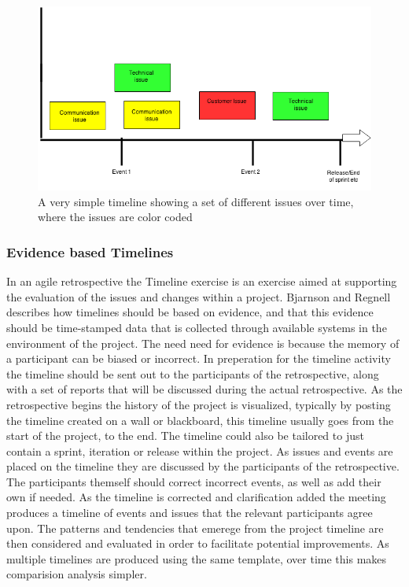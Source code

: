 \documentclass[12pt]{article}
\begin{document}
\begin{figure}[h!]
	\centering
	\includegraphics[width=\textwidth]{figures/Timeline-Example.png}
	\caption{A very simple timeline showing a set of different issues over time, where the issues are color coded}
	\label{figure:Timeline-Example}
\end{figure}

\subsubsection{Evidence based Timelines}
In an agile retrospective the Timeline exercise is an exercise aimed at supporting the evaluation of the issues and changes within a project. Bjarnson and Regnell~\cite{Bjarnason2012} describes how timelines should be based on evidence, and that this evidence should be time-stamped data that is collected through available systems in the environment of the project. The need need for evidence is because the memory of a participant can be biased or incorrect. In preperation for the timeline activity the timeline should be sent out to the participants of the retrospective, along with a set of reports that will be discussed during the actual retrospective. As the retrospective begins the history of the project is visualized, typically by posting the timeline created on a wall or blackboard, this timeline usually goes from the start of the project, to the end. The timeline could also be tailored to just contain a sprint, iteration or release within the project. As issues and events are placed on the timeline they are discussed by the participants of the retrospective. The participants themself should correct incorrect events, as well as add their own if needed. As the timeline is corrected and clarification added the meeting produces a timeline of events and issues that the relevant participants agree upon. The patterns and tendencies that emerege from the project timeline are then considered and evaluated in order to facilitate potential improvements. As multiple timelines are produced using the same template, over time this makes comparision analysis simpler. 
\end{document}
